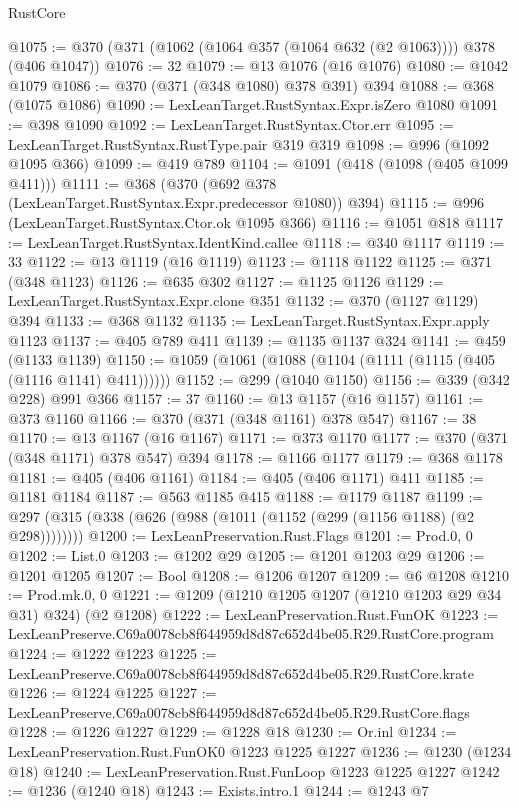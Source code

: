 \begin{lexlean}{RustCore}
\begin{coremodule}
@1075 := @370 (@371 (@1062 (@1064 @357 (@1064 @632 (@2 @1063)))) @378 (@406 @1047))
@1076 := 32
@1079 := @13 @1076 (@16 @1076)
@1080 := @1042 @1079
@1086 := @370 (@371 (@348 @1080) @378 @391) @394
@1088 := @368 (@1075 @1086)
@1090 := LexLeanTarget.RustSyntax.Expr.isZero @1080
@1091 := @398 @1090
@1092 := LexLeanTarget.RustSyntax.Ctor.err
@1095 := LexLeanTarget.RustSyntax.RustType.pair @319 @319
@1098 := @996 (@1092 @1095 @366)
@1099 := @419 @789
@1104 := @1091 (@418 (@1098 (@405 @1099 @411)))
@1111 := @368 (@370 (@692 @378 (LexLeanTarget.RustSyntax.Expr.predecessor @1080)) @394)
@1115 := @996 (LexLeanTarget.RustSyntax.Ctor.ok @1095 @366)
@1116 := @1051 @818
@1117 := LexLeanTarget.RustSyntax.IdentKind.callee
@1118 := @340 @1117
@1119 := 33
@1122 := @13 @1119 (@16 @1119)
@1123 := @1118 @1122
@1125 := @371 (@348 @1123)
@1126 := @635 @302
@1127 := @1125 @1126
@1129 := LexLeanTarget.RustSyntax.Expr.clone @351
@1132 := @370 (@1127 @1129) @394
@1133 := @368 @1132
@1135 := LexLeanTarget.RustSyntax.Expr.apply @1123
@1137 := @405 @789 @411
@1139 := @1135 @1137 @324
@1141 := @459 (@1133 @1139)
@1150 := @1059 (@1061 (@1088 (@1104 (@1111 (@1115 (@405 (@1116 @1141) @411))))))
@1152 := @299 (@1040 @1150)
@1156 := @339 (@342 @228) @991 @366
@1157 := 37
@1160 := @13 @1157 (@16 @1157)
@1161 := @373 @1160
@1166 := @370 (@371 (@348 @1161) @378 @547)
@1167 := 38
@1170 := @13 @1167 (@16 @1167)
@1171 := @373 @1170
@1177 := @370 (@371 (@348 @1171) @378 @547) @394
@1178 := @1166 @1177
@1179 := @368 @1178
@1181 := @405 (@406 @1161)
@1184 := @405 (@406 @1171) @411
@1185 := @1181 @1184
@1187 := @563 @1185 @415
@1188 := @1179 @1187
@1199 := @297 (@315 (@338 (@626 (@988 (@1011 (@1152 (@299 (@1156 @1188) (@2 @298))))))))
@1200 := LexLeanPreservation.Rust.Flags
@1201 := Prod.{0, 0}
@1202 := List.{0}
@1203 := @1202 @29
@1205 := @1201 @1203 @29
@1206 := @1201 @1205
@1207 := Bool
@1208 := @1206 @1207
@1209 := @6 @1208
@1210 := Prod.mk.{0, 0}
@1221 := @1209 (@1210 @1205 @1207 (@1210 @1203 @29 @34 @31) @324) (@2 @1208)
@1222 := LexLeanPreservation.Rust.FunOK
@1223 := LexLeanPreserve.C69a0078cb8f644959d8d87c652d4be05.R29.RustCore.program
@1224 := @1222 @1223
@1225 := LexLeanPreserve.C69a0078cb8f644959d8d87c652d4be05.R29.RustCore.krate
@1226 := @1224 @1225
@1227 := LexLeanPreserve.C69a0078cb8f644959d8d87c652d4be05.R29.RustCore.flags
@1228 := @1226 @1227
@1229 := @1228 @18
@1230 := Or.inl
@1234 := LexLeanPreservation.Rust.FunOK0 @1223 @1225 @1227
@1236 := @1230 (@1234 @18)
@1240 := LexLeanPreservation.Rust.FunLoop @1223 @1225 @1227
@1242 := @1236 (@1240 @18)
@1243 := Exists.intro.{1}
@1244 := @1243 @7

\end{coremodule}
\end{lexlean}
